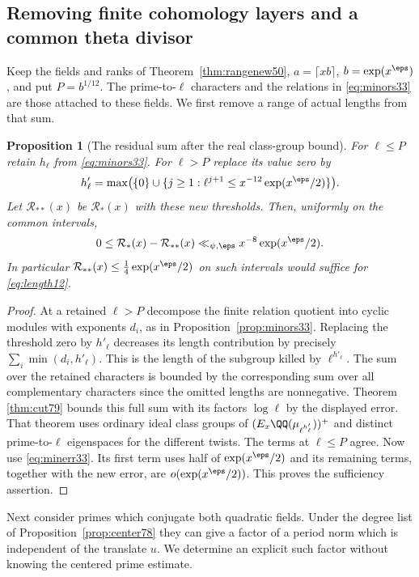 \documentclass[a4paper,11pt]{article}
\newtheorem{proposition}{Proposition}[section]
\theoremstyle{definition}
\theoremstyle{remark}
\numberwithin{equation}{section}
\begin{document}
\subsection{Removing finite cohomology layers and a common theta divisor}\label{nav:II-25}
Keep the fields and ranks of Theorem~\ref{thm:rangenew50},
\(a=\lceil xb\rceil\), \(b=\exp(x^\eps)\), and put
\(P=b^{1/12}\). The prime-to-\(\ell\) characters and the
relations in \eqref{eq:minors33} are those attached to these
fields. We first remove a range of actual lengths from that sum.

\begin{proposition}[The residual sum after the real class-group bound]
\label{prop:res80}
For \(\ell\le P\) retain \(h_\ell\) from \eqref{eq:minors33}.
For \(\ell>P\) replace its value zero by
\[
  h'_\ell=\max\bigl(\{0\}\cup
       \{j\ge1:\ell^{j+1}\le x^{-12}\exp(x^\eps/2)\}\bigr).
\]
Let \(\mathcal R_{**}(x)\) be \(\mathcal R_*(x)\) with these
new thresholds. Then, uniformly on the common intervals,
\[
     0\le \mathcal R_*(x)-\mathcal R_{**}(x)
           \ll_{\psi,\eps} x^{-8}\exp(x^\eps/2).
\]
In particular \(\mathcal R_{**}(x)\le\frac14\exp(x^\eps/2)\)
on such intervals would suffice for \eqref{eq:length12}.
\end{proposition}
\begin{proof}
At a retained \(\ell>P\) decompose the finite relation
quotient into cyclic modules with exponents \(d_i\), as in
Proposition~\ref{prop:minors33}. Replacing the threshold zero
by \(h'_\ell\) decreases its length contribution by precisely
\(\sum_i\min(d_i,h'_\ell)\). This is the length of the subgroup
killed by \(\ell^{h'_\ell}\). The sum over the retained
characters is bounded by the corresponding sum over all
complementary characters since the omitted lengths are
nonnegative. Theorem \ref{thm:cut79} bounds this full sum with its factors \(\log\ell\)
by the displayed error. That theorem uses ordinary ideal class
groups of \((E_x\QQ(\mu_{\ell^{h'_\ell}}))^+\) and distinct
prime-to-\(\ell\) eigenspaces for the different twists. The
terms at \(\ell\le P\) agree. Now use \eqref{eq:minerr33}.
Its first term uses half of \(\exp(x^\eps/2)\) and its remaining
terms, together with the new error, are \(o(\exp(x^\eps/2))\).
This proves the sufficiency assertion.
\end{proof}

Next consider primes which conjugate both quadratic fields.
Under the degree list of Proposition~\ref{prop:center78} they
can give a factor of a period norm which is independent of the
translate \(u\). We determine an explicit such factor without
knowing the centered prime estimate.
\end{document}
